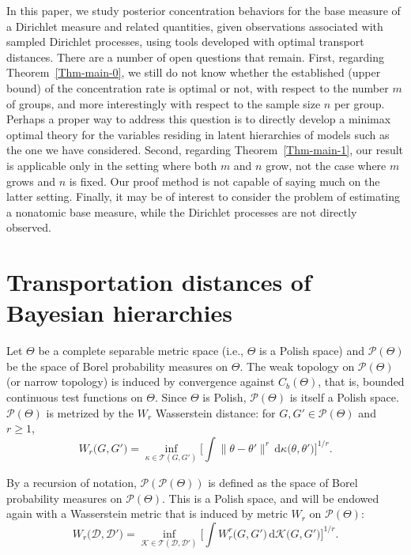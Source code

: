 \documentclass[MSNbibl,number,citesort]{arxbj}
\newcommand{\Cb}{C_b}
\newcommand{\Dcal}{\mathcal{D}}
\newcommand{\Kcal}{\mathcal{K}}
\newcommand{\Pcal}{\mathscr{P}}
\newcommand{\TPlan}{\mathcal{T}}
\newcommand{\W}{W}
\newcommand{\Wr}{W_r}
\newcommand{\Wcalr}{\W_r}
\newcommand{\coupling}{\kappa}
\begin{document}
In this paper, we study posterior concentration behaviors for the base measure
of a Dirichlet measure and related quantities,
given observations associated with
sampled Dirichlet processes, using
tools developed with optimal transport distances. There are a number
of open questions that remain.
First, regarding Theorem~\ref{Thm-main-0}, we still do not know
whether the established (upper bound) of the concentration rate is optimal
or not, with respect to the number $m$ of groups,
and more interestingly with respect to the sample size $n$ per group.
Perhaps a proper way to address this question is
to directly develop a minimax optimal theory for the variables
residing in latent hierarchies of models such as the one we have considered.
Second, regarding Theorem~\ref{Thm-main-1}, our result is
applicable only in the setting where both $m$ and $n$ grow,
not the case where $m$ grows and $n$ is fixed.
Our proof method is not capable of saying much on the latter setting.
Finally, it may be of interest to consider
the problem of estimating a nonatomic base measure,
while the Dirichlet processes are not directly observed.

\section{Transportation distances of Bayesian hierarchies}
\label{Sec-transport}
%
Let $\Theta$ be a complete separable metric space (i.e., $\Theta$ is a
Polish space)
and $\Pcal(\Theta)$ be the space of Borel probability measures on
$\Theta$.
The weak topology on $\Pcal(\Theta)$ (or narrow topology) is induced by
convergence
against $\Cb(\Theta)$, that is, bounded continuous test functions on
$\Theta$.
Since $\Theta$ is Polish, $\Pcal(\Theta)$ is itself a Polish space.
$\Pcal(\Theta)$ is metrized by the $W_r$ Wasserstein distance: for
$G,G' \in\Pcal(\Theta)$ and $r \geq1$,
%
\[
\Wr \bigl(G,G' \bigr) = \inf_{\coupling\in\TPlan(G,G')} \biggl[\int
\bigl\| \theta- \theta'\bigr\|^r \,\mathrm{d}\coupling \bigl(\theta,
\theta' \bigr) \biggr]^{1/r}.
\]

By a recursion of notation, $\Pcal(\Pcal(\Theta))$ is defined as
the space of Borel probability measures on $\Pcal(\Theta)$. This is
a Polish space, and will be endowed again with a Wasserstein metric that
is induced by metric $\Wr$ on $\Pcal(\Theta)$:
%
%
\begin{equation}
\label{Eqn-W2-def} \Wcalr \bigl(\Dcal,\Dcal' \bigr) = \inf
_{\Kcal\in\TPlan(\Dcal,\Dcal')} \biggl[ \int\Wr^r \bigl(G,G'
\bigr) \,\mathrm{d}\Kcal \bigl(G,G' \bigr) \biggr]^{1/r}.
\end{equation}
\end{document}
